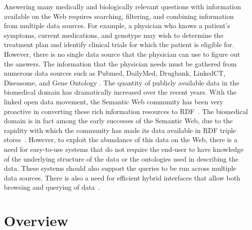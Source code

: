 \documentclass{acm_proc_article-sp}
\begin{document}
Answering many medically and biologically relevant questions with information available on the Web requires searching, filtering, and combining information from multiple data sources.  For example, a physician who knows a patient's symptoms, current medications, and genotype may wish to determine the treatment plan and identify clinical trials for which the patient is eligible for.  However, there is no single data source that the physician can use to figure out the answers. The information that the physician needs must be gathered from numerous data sources such as Pubmed, DailyMed, Drugbank, LinkedCT, Diseasome,  and Gene Ontology \cite{Pubmed, DailyMed, Drugbank, LinkedCT, Diseasome, GO}. The quantity of publicly available data in the biomedical domain has dramatically increased over the recent years. With the linked open data movement, the Semantic Web community has been very proactive in converting these rich information resources to RDF~\cite{LinkingData}.  The biomedical domain is in fact among the early successes of the Semantic Web, due to the rapidity with which the community has made its data available in RDF triple stores~\cite{Yip}.  However, to exploit the abundance of this data on the Web, there is a need for easy-to-use systems that do not require the end-user to have knowledge of the underlying  structure of the data or the ontologies used in describing the data. These systems should also support the queries to be run across multiple data sources.  There is also a  need for efficient hybrid interfaces that allow both browsing and querying of data~\cite{Jentzsch}.  



\section{Overview}
\end{document}
